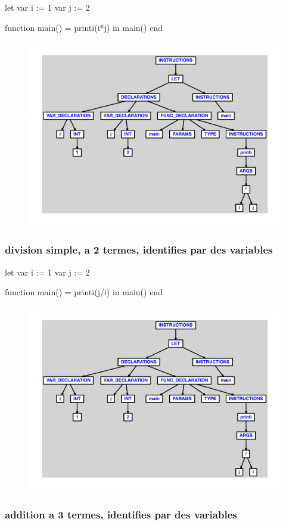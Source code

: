 \documentclass{article}
\begin{document}
\begin{verbatimtab}
let
	var i := 1
	var j := 2

	function main() = printi(i*j)
in main() end
\end{verbatimtab}
\begin{figure}[H]\centering\includegraphics[max width=\textwidth]{ast/ast_53.pdf}\end{figure}\subsubsection{division simple, a 2 termes, identifies par des variables}
\begin{verbatimtab}
let
	var i := 1
	var j := 2

	function main() = printi(j/i)
in main() end
\end{verbatimtab}
\begin{figure}[H]\centering\includegraphics[max width=\textwidth]{ast/ast_54.pdf}\end{figure}\subsubsection{addition a 3 termes, identifies par des variables}
\end{document}
